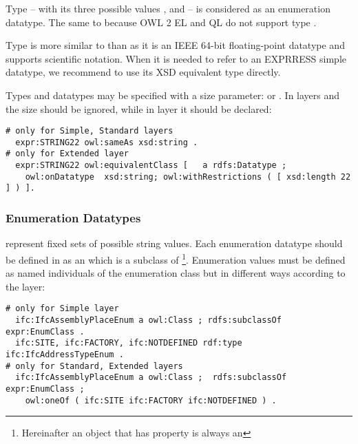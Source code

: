 Type  -- with its three possible values ,  and  -- is considered as an enumeration data\-type. The same to  because OWL 2 EL and QL do not support type  \cite{motik2013owl}.

Type  is more similar to  than  as it is an IEEE 64-bit floating-point data\-type and supports scientific notation. When it is needed to refer to an EXPRRESS simple data\-type, we recommend to use its XSD equivalent type directly.

Types  and  data\-types may be specified with a size parameter:  or . In layers \simple{} and \standard{} the size should be ignored, while in layer \extended{} it should be declared:

\begin{lstlisting}
# only for Simple, Standard layers
  expr:STRING22 owl:sameAs xsd:string .
# only for Extended layer
  expr:STRING22 owl:equivalentClass [   a rdfs:Datatype ;
    owl:onDatatype  xsd:string; owl:withRestrictions ( [ xsd:length 22 ] ) ].
\end{lstlisting}


\subsubsection{Enumeration Datatypes} represent fixed sets of possible string values. Each enumeration data\-type should be defined in \ifcowl{} as an  which is a subclass of \footnote{Hereinafter an object that has property  is always an }. Enumeration values must be defined as named individuals of the enumeration class but in different ways according to the layer:

\begin{lstlisting}
# only for Simple layer
  ifc:IfcAssemblyPlaceEnum a owl:Class ; rdfs:subclassOf expr:EnumClass .
  ifc:SITE, ifc:FACTORY, ifc:NOTDEFINED rdf:type ifc:IfcAddressTypeEnum .
# only for Standard, Extended layers
  ifc:IfcAssemblyPlaceEnum a owl:Class ;  rdfs:subclassOf expr:EnumClass ;
    owl:oneOf ( ifc:SITE ifc:FACTORY ifc:NOTDEFINED ) .
\end{lstlisting}

